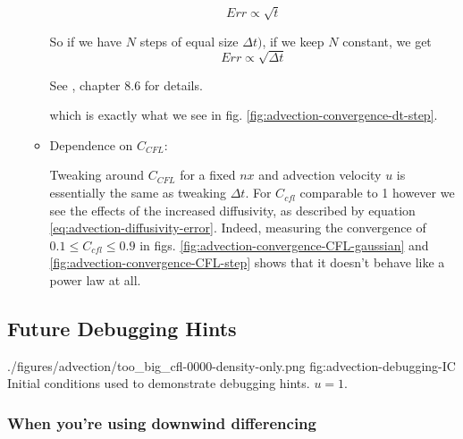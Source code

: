 \begin{itemize}
\begin{itemize}
				\begin{equation*}
				     	Err \propto \sqrt{t}
				\end{equation*}
				
				So if we have $N$ steps of equal size $\Delta t)$, if we keep $N$ constant, we get
				\begin{equation}
				     	Err \propto \sqrt{\Delta t}
				\end{equation}
				
				See \cite{leveque_2002}, chapter 8.6 for details.
				
				which is exactly what we see in  fig. \ref{fig:advection-convergence-dt-step}.
				
			
			\item  Dependence on $C_{CFL}$:
				
				Tweaking around $C_{CFL}$ for a fixed $nx$ and advection velocity $u$ is essentially the same as tweaking $\Delta t$.
				For $C_{cfl}$ comparable to 1 however we see the effects of the increased diffusivity, as described by equation \ref{eq:advection-diffusivity-error}.
				Indeed, measuring the convergence of $0.1 \leq C_{cfl} \leq 0.9 $ in figs. \ref{fig:advection-convergence-CFL-gaussian} and \ref{fig:advection-convergence-CFL-step} shows that it doesn't behave like a power law at all.
			
		\end{itemize}


     
     
\end{itemize}


















\subsection{Future Debugging Hints}




\quickfigcap
	{./figures/advection/too_big_cfl-0000-density-only.png}
	{fig:advection-debugging-IC}
	{Initial conditions used to demonstrate debugging hints. $u = 1$.}


\subsubsection{When you're using downwind differencing}


